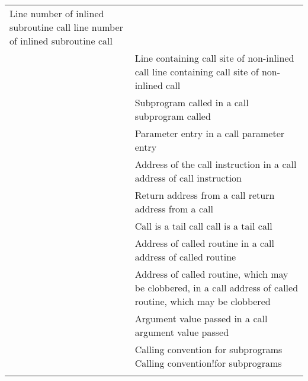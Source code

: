 \begin{longtable}{P{6.2cm}|P{8.5cm}}
           {Line number of inlined subroutine call}
           {line number of inlined subroutine call} \\
&
           {Line containing call site of non-inlined call} 
           {line containing call site of non-inlined call} \\
\DWATcalloriginTARG{}
&
           {Subprogram called in a call}
           {subprogram called}
            \\
\DWATcallparameterTARG{}
&
           {Parameter entry in a call}
           {parameter entry}
            \\
\DWATcallpcTARG{}
&
           {Address of the call instruction in a call}
           {address of call instruction}
            \\
\DWATcallreturnpcTARG{}
&
           {Return address from a call}
           {return address from a call}
            \\
\DWATcalltailcallTARG{}
&
           {Call is a tail call}
           {call is a tail call}
            \\
\DWATcalltargetTARG{}
&
           {Address of called routine in a call}
           {address of called routine}
            \\
\DWATcalltargetclobberedTARG{}
&
           {Address of called routine, which may be clobbered, in a call}
           {address of called routine, which may be clobbered}
            \\
\DWATcallvalueTARG{}
&
           {Argument value passed in a call}
           {argument value passed}
            \\
\DWATcallingconventionTARG{} 
&
           {Calling convention for subprograms}
           {Calling convention!for subprograms} \\
&

\end{longtable}
